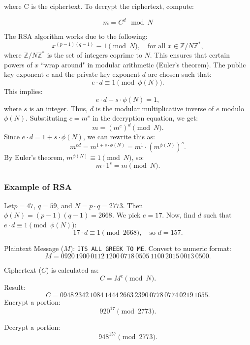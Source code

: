 where C is the ciphertext. To decrypt the ciphertext, compute:

\[ m = C^d \mod N \]

The RSA algorithm works due to the following:
\[
x^{(p-1)(q-1)} \equiv 1 \pmod{N}, \quad \text{for all } x \in \mathbb{Z}/N\mathbb{Z}^*,
\]
where \( \mathbb{Z}/N\mathbb{Z}^* \) is the set of integers coprime to \( N \). This ensures that certain powers of \( x \) ``wrap around" in modular arithmetic (Euler's theorem).
The public key exponent \( e \) and the private key exponent \( d \) are chosen such that:
\[
e \cdot d \equiv 1 \pmod{\phi(N)}.
\]
This implies:
\[
e \cdot d - s \cdot \phi(N) = 1,
\]
where \( s \) is an integer. Thus, \( d \) is the modular multiplicative inverse of \( e \) modulo \( \phi(N) \).
Substituting \( c = m^e \) in the decryption equation, we get:
\[
m = (m^e)^d \pmod{N}.
\]
Since \( e \cdot d = 1 + s \cdot \phi(N) \), we can rewrite this as:
\[
m^{ed} = m^{1 + s \cdot \phi(N)} = m^1 \cdot (m^{\phi(N)})^s.
\]
By Euler's theorem, \( m^{\phi(N)} \equiv 1 \pmod{N} \), so:
\[
m \cdot 1^s = m \pmod{N}.
\]

\subsubsection{Example of RSA}

Let\( p = 47 \), \( q = 59 \), and \( N = p \cdot q = 2773 \). Then \( \phi(N) = (p-1)(q-1) = 2668 \). We pick \( e = 17 \).
Now, find \( d \) such that \( e \cdot d \equiv 1 \pmod{\phi(N)} \): 
    \[
    17 \cdot d \equiv 1 \pmod{2668}, \quad \text{so } d = 157.
    \]

 Plaintext Message (\( M \)): \texttt{ITS ALL GREEK TO ME}. Convert to numeric format:
    \[
    M = 0920 \, 1900 \, 0112 \, 1200 \, 0718 \, 0505 \, 1100 \, 2015 \, 0013 \, 0500.
    \]

Ciphertext (\( C \)) is calculated as:
    \[
    C = M^e \pmod{N}.
    \]
Result:
    \[
    C = 0948 \, 2342 \, 1084 \, 1444 \, 2663 \, 2390 \, 0778 \, 0774 \, 0219 \, 1655.
    \]
Encrypt a portion: 
    \[
    920^{17} \pmod{2773}.
    \]
    
Decrypt a portion:
    \[
    948^{157} \pmod{2773}.
    \]

